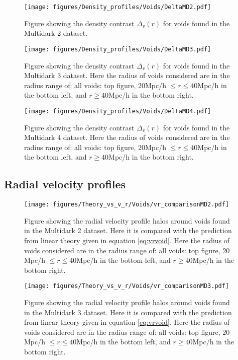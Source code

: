 \begin{figure}[htbp]\label{fig:DeltaMD2}
    \texttt{[image: figures/Density\_profiles/Voids/DeltaMD2.pdf]}
    \caption{Figure showing the density contrast $\Delta_v(r)$ for voids found in the Multidark 2 dataset.}
\end{figure}
\begin{figure}[htbp]\label{fig:DeltaMD3}
    \texttt{[image: figures/Density\_profiles/Voids/DeltaMD3.pdf]}
    \caption{Figure showing the density contrast $\Delta_v(r)$ for voids found in the Multidark 3 dataset. Here the radius of voids considered are in the radius range of: all voids: top figure, $20$Mpc/h $\leq r\leq 40$Mpc/h in the bottom left, and $r\geq 40$Mpc/h in the bottom right.}
\end{figure}
\begin{figure}[htbp]\label{fig:DeltaMD4}
    \texttt{[image: figures/Density\_profiles/Voids/DeltaMD4.pdf]}
    \caption{Figure showing the density contrast $\Delta_v(r)$ for voids found in the Multidark 4 dataset. Here the radius of voids considered are in the radius range of: all voids: top figure, $20$Mpc/h $\leq r\leq 40$Mpc/h in the bottom left, and $r\geq 40$Mpc/h in the bottom right.}
\end{figure}
\subsection{Radial velocity profiles}
\begin{figure}[htbp]\label{fig:vrMD2}
    \texttt{[image: figures/Theory\_vs\_v\_r/Voids/vr\_comparisonMD2.pdf]}
    \caption{Figure showing the radial velocity profile halos around voids found in the Multidark 2 dataset. Here it is compared with the prediction from linear theory given in equation \ref{eq:vrvoid}. Here the radius of voids considered are in the radius range of: all voids: top figure, $20$Mpc/h $\leq r\leq 40$Mpc/h in the bottom left, and $r\geq 40$Mpc/h in the bottom right.}
\end{figure}

\begin{figure}[htbp]\label{fig:vrMD3}
    \texttt{[image: figures/Theory\_vs\_v\_r/Voids/vr\_comparisonMD3.pdf]}
    \caption{Figure showing the radial velocity profile halos around voids found in the Multidark 3 dataset. Here it is compared with the prediction from linear theory given in equation \ref{eq:vrvoid}. Here the radius of voids considered are in the radius range of: all voids: top figure, $20$Mpc/h $\leq r\leq 40$Mpc/h in the bottom left, and $r\geq 40$Mpc/h in the bottom right.}
\end{figure}

